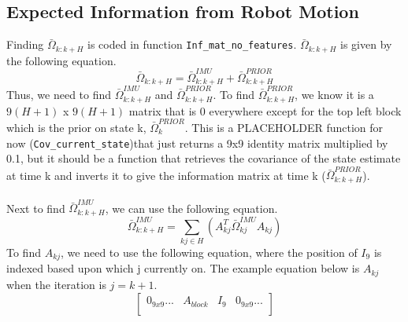 \subsection{Expected Information from Robot Motion}\label{sub:info_motion}

Finding $\bar{\Omega}_{k:k+H}$ is coded in function \texttt{Inf\_mat\_no\_features}. $\bar{\Omega}_{k:k+H}$ is given by the following equation.
\begin{equation}
    \bar{\Omega}_{k:k+H} = \bar{\Omega}_{k:k+H}^{IMU} + \bar{\Omega}_{k:k+H}^{PRIOR}
    \label{eq:omega_IMU}
\end{equation}
Thus, we need to find $\bar{\Omega}_{k:k+H}^{IMU}$ and $\bar{\Omega}_{k:k+H}^{PRIOR}$. To find $\bar{\Omega}_{k:k+H}^{PRIOR}$, we know it is a $9(H+1)$ x $9(H+1)$ matrix that is 0 everywhere except for the top left block which is the prior on state k, $\bar{\Omega}_{k}^{PRIOR}$. This is a PLACEHOLDER function for now (\texttt{Cov\_current\_state})that just returns a 9x9 identity matrix multiplied by 0.1, but it should be a function that retrieves the covariance of the state estimate at time k and inverts it to give the information matrix at time k ($\bar{\Omega}_{k:k+H}^{PRIOR}$). \\ \\
Next to find $\bar{\Omega}_{k:k+H}^{IMU}$, we can use the following equation.
\begin{equation}
    \bar{\Omega}_{k:k+H}^{IMU} = \sum_{kj \in H} (A^T_{kj}\bar{\Omega}_{kj}^{IMU}A_{kj})
\end{equation}
To find $A_{kj}$, we need to use the following equation, where the position of $I_9$ is indexed based upon which j currently on. The example equation below is $A_{kj}$ when the iteration is $j = k + 1$.
\[
\begin{bmatrix}
    0_{9x9} ... & A_{block} & I_9 & 0_{9x9} ... \\
\end{bmatrix}\]

